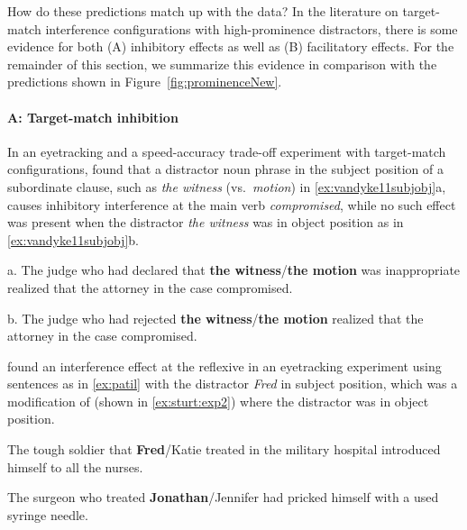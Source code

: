 \documentclass{cambridge7A}\usepackage[]{graphicx}\usepackage[]{color}
\newcommand{\revisedII}[1]{#1}
\begin{document}

\revisedII{How do these predictions match up with the data?}
In the literature on target-match interference configurations with high-prominence distractors, there is some evidence for both (A) inhibitory effects as well as (B) facilitatory effects. 
For the remainder of this section, we summarize this evidence in comparison with the predictions shown in Figure~\ref{fig:prominenceNew}.


\paragraph{A: Target-match inhibition}
In an eyetracking and a speed-accuracy trade-off experiment with target-match configurations, \cite{VanDykeMcElree2011} found that a distractor noun phrase in the subject position of a subordinate clause, such as \textit{the witness} (vs.\ \textit{motion}) in \ref{ex:vandyke11subjobj}a, causes inhibitory interference at the main verb \textit{compromised}, while no such effect was present when the distractor \textit{the witness} was in object position as in \ref{ex:vandyke11subjobj}b.

\begin{exe} 
\ex \label{ex:vandyke11subjobj}
\begin{xlist}
\item[a.] The judge who had declared that \textbf{the witness}/\textbf{the motion} was inappropriate realized that the attorney in the case compromised.
\item[b.] The judge who had rejected \textbf{the witness}/\textbf{the motion} realized that the attorney in the case compromised.
\end{xlist}
\end{exe}  


\cite{PatilVasishthLewis2016} found an interference effect at the reflexive in an eyetracking experiment using sentences as in \ref{ex:patil} with the distractor \textit{Fred} in subject position, which was a modification of \cite{Sturt2003} (shown in \ref{ex:sturt:exp2}) where the distractor was in object position.

\begin{exe} 
\ex\label{ex:patil}
The tough soldier that \textbf{Fred}/Katie treated in the military hospital introduced himself to all the nurses.
\end{exe}  
\begin{exe} 
\ex\label{ex:sturt:exp2}
The surgeon who treated \textbf{Jonathan}/Jennifer had pricked himself with a used syringe needle. 
\end{exe}  
\end{document}
